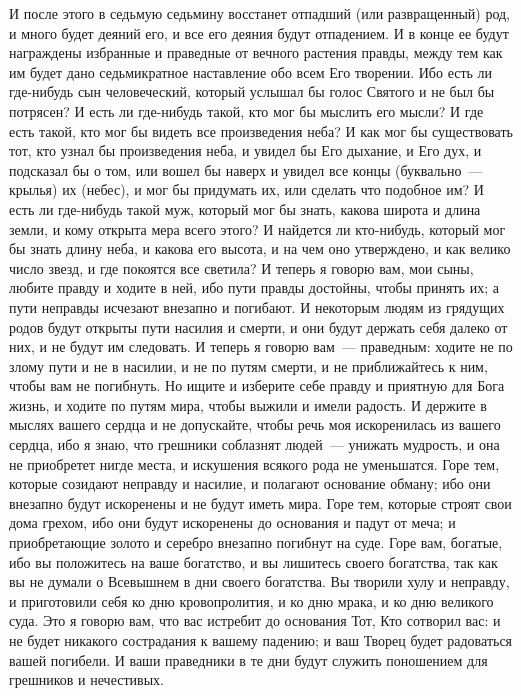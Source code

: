 И после этого в седьмую седьмину восстанет отпадший (или развращенный)
род, и много будет деяний его, и все его деяния будут отпадением.
И в конце ее будут награждены избранные и праведные от вечного
растения правды, между тем как им будет дано седьмикратное наставление обо всем
Его творении.
Ибо есть ли где-нибудь сын человеческий, который услышал бы голос
Святого и не был бы потрясен?
И есть ли где-нибудь такой, кто мог бы мыслить его мысли?
И где есть такой, кто мог бы видеть все произведения неба?
И как мог бы существовать тот, кто узнал бы произведения неба, и
увидел бы Его дыхание, и Его дух, и подсказал бы о том, или вошел бы наверх и
увидел все концы (буквально~--- крылья) их (небес), и мог бы придумать их, или
сделать что подобное им?
И есть ли где-нибудь такой муж, который мог бы знать, какова широта и
длина земли, и кому открыта мера всего этого?
И найдется ли кто-нибудь, который мог бы знать длину неба, и какова
его высота, и на чем оно утверждено, и как велико число звезд, и где покоятся
все светила?
И теперь я говорю вам, мои сыны, любите правду и ходите в ней,
ибо пути правды достойны, чтобы принять их; а пути неправды исчезают внезапно и
погибают.
И некоторым людям из грядущих родов будут открыты пути насилия и
смерти, и они будут держать себя далеко от них, и не будут им следовать.
И теперь я говорю вам~--- праведным: ходите не по злому пути и не в
насилии, и не по путям смерти, и не приближайтесь к ним, чтобы вам не
погибнуть.
Но ищите и изберите себе правду и приятную для Бога жизнь, и ходите по
путям мира, чтобы выжили и имели радость.
И держите в мыслях вашего сердца и не допускайте, чтобы речь моя
искоренилась из вашего сердца, ибо я знаю, что грешники соблазнят людей~---
унижать мудрость, и она не приобретет нигде места, и искушения всякого рода не
уменьшатся.
Горе тем, которые созидают неправду и насилие, и полагают основание
обману; ибо они внезапно будут искоренены и не будут иметь мира.
Горе тем, которые строят свои дома грехом, ибо они будут искоренены до
основания и падут от меча; и приобретающие золото и серебро внезапно погибнут
на суде.
Горе вам, богатые, ибо вы положитесь на ваше богатство, и вы лишитесь
своего богатства, так как вы не думали о Всевышнем в дни своего богатства.
Вы творили хулу и неправду, и приготовили себя ко дню кровопролития, и
ко дню мрака, и ко дню великого суда.
Это я говорю вам, что вас истребит до основания Тот, Кто сотворил вас:
и не будет никакого сострадания к вашему падению; и ваш Творец будет радоваться
вашей погибели.
И ваши праведники в те дни будут служить поношением для грешников и
нечестивых.
